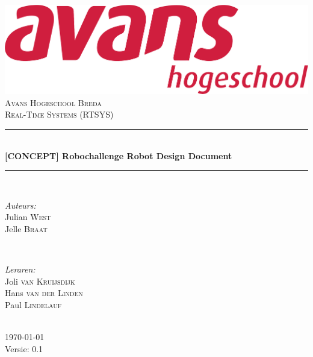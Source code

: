\documentclass[12pt]{article} %
\begin{document}
\begin{titlepage}
\newcommand{\HRule}{\rule{\linewidth}{0.5mm}} %

\center %
\includegraphics[scale=.1,keepaspectratio]{avans.pdf} \\
\textsc{\Large Avans Hogeschool Breda}\\[0.5cm] %
\textsc{\large Real-Time Systems (RTSYS)}\\[0.5cm] %
\HRule \\[0.4cm]
{ \huge \bfseries \textbf{[CONCEPT]} Robochallenge Robot Design Document}\\[0.4cm] %
\HRule \\[1.5cm]

\begin{minipage}{0.4\textwidth}
\begin{flushleft} \large
\emph{Auteurs:}\\
Julian \textsc{West} \\
Jelle \textsc{Braat} \\
\end{flushleft}
\end{minipage}
~
\begin{minipage}{0.4\textwidth}
\begin{flushright} \large
\emph{Leraren:} \\
Joli \textsc{van Kruijsdijk} \\ %
Hans \textsc{van der Linden} \\
Paul \textsc{Lindelauf} %
\end{flushright}
\end{minipage}\\[4cm]

{\large \today}\\[3cm] %
Versie: 0.1
\vfill %

\end{titlepage}
\end{document}
